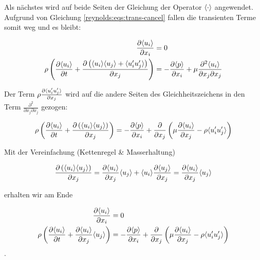 Als nächstes wird auf beide Seiten der Gleichung der Operator $\langle \cdot \rangle$ angewendet.
Aufgrund von Gleichung \ref{reynolds:eqs:trans-cancel} fallen die transienten Terme somit
weg und es bleibt:

\begin{align}
    \frac{\partial \langle u_i \rangle}{\partial x_i} &= 0 \\
    \rho \left(
            \frac{\partial \langle u_i \rangle}{\partial t} +
            \frac{\partial \left( \langle u_i \rangle \langle u_j \rangle + \langle u_i' u_j' \rangle\right)}{\partial x_j}
        \right) &=
        - \frac{\partial \langle p \rangle}{\partial x_i} + 
        \mu \frac{\partial^2 \langle u_i \rangle}{\partial x_j \partial x_j}
\end{align}

Der Term $\rho \frac{\partial \langle u_i' u_j' \rangle}{\partial x_j}$ wird auf die andere Seiten
des Gleichheitszeichens in den Term $\frac{\partial^2}{\partial x_j \partial x_j}$ gezogen:

\begin{equation}
    \rho \left(
            \frac{\partial \langle u_i \rangle}{\partial t} +
            \frac{\partial \left( \langle u_i \rangle \langle u_j \rangle\right)}{\partial x_j}
        \right) =
        - \frac{\partial \langle p \rangle}{\partial x_i} + 
            \frac{\partial}{\partial x_j} \left(
            \mu \frac{\partial \langle u_i \rangle}{\partial x_j} - \rho \langle u_i' u_j' \rangle
        \right)
\end{equation}

Mit der Vereinfachung (Kettenregel \& Masserhaltung)

\begin{equation}
    \frac{\partial \left( \langle u_i \rangle \langle u_j \rangle\right)}{\partial x_j} = \\
        \frac{\partial \langle u_i \rangle}{\partial x_j} \langle u_j \rangle +
        \langle u_i \rangle \frac{\partial \langle u_j \rangle}{\partial x_j} = \\
        \frac{\partial \langle u_i \rangle}{\partial x_j} \langle u_j \rangle
\end{equation}

erhalten wir am Ende

\begin{align}
    \label{reynolds:eqs:rans1}
    \frac{\partial \langle u_i \rangle}{\partial x_i} &= 0 \\
    \label{reynolds:eqs:rans2}
    \rho \left(
            \frac{\partial \langle u_i \rangle}{\partial t} +
            \frac{\partial \langle u_i \rangle}{\partial x_j} \langle u_j \rangle
        \right) &=
        - \frac{\partial \langle p \rangle}{\partial x_i} + 
            \frac{\partial}{\partial x_j} \left(
            \mu \frac{\partial \langle u_i \rangle}{\partial x_j} - \rho \langle u_i' u_j' \rangle
        \right)
\end{align}.

